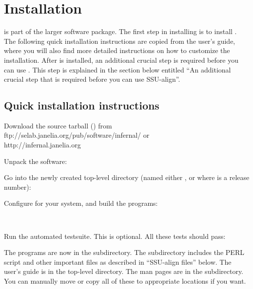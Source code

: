 \section{Installation}
\label{section:install}

 is part of the larger  software
package. The first step in installing  is to install
. The following quick installation instructions are
copied from the  user's guide, where you will also find
more detailed instructions on how to customize the installation. 
After  is installed, an additional crucial step is
required before you can use . This step is explained
in the section below entitled ``An additional crucial step that is
required before you can use SSU-align''.

\subsection{Quick installation instructions}

Download the source tarball () from 
                  {ftp://selab.janelia.org/pub/software/infernal/}
or \\
                  {http://infernal.janelia.org}

Unpack the software:


Go into the newly created top-level directory (named either
, or  where  is a release
number):


Configure for your system, and build the programs:

\\

Run the automated testsuite. This is optional. All these tests should
pass:


The  programs are now in the 
subdirectory. The  subdirectory includes the
 PERL script and other important files as described in
``SSU-align files'' below. The  user's guide is in the 
top-level  directory. The man pages are in the
 subdirectory. You can manually move or
copy all of these to appropriate locations if you want. 

